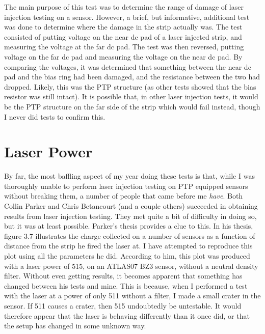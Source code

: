 \documentclass{report}
\begin{document}
            The main purpose of this test was to determine the range of damage of laser injection testing on a sensor. However, a brief, but informative, additional test was done to determine where the damage in the strip actually was. The test consisted of putting voltage on the near dc pad of a laser injected strip, and measuring the voltage at the far dc pad. The test was then reversed, putting voltage on the far dc pad and measuring the voltage on the near dc pad. By comparing the voltages, it was determined that something between the near dc pad and the bias ring had been damaged, and the resistance between the two had dropped. Likely, this was the PTP structure (as other tests showed that the bias resistor was still intact). It is possible that, in other laser injection tests, it would be the PTP structure on the far side of the strip which would fail instead, though I never did tests to confirm this.



        \section{Laser Power} \label{sect:laser_power}
            By far, the most baffling aspect of my year doing these tests is that, while I was thoroughly unable to perform laser injection testing on PTP equipped sensors without breaking them, a number of people that came before me \textit{have}. Both Collin Parker and Chris Betancourt (and a couple others) succeeded in obtaining results from laser injection testing. They met quite a bit of difficulty in doing so, but it was at least possible. Parker's thesis provides a clue to this. In his thesis, figure 3.7 illustrates the charge collected on a number of sensors as a function of distance from the strip he fired the laser at. I have attempted to reproduce this plot using all the parameters he did. According to him, this plot was produced with a laser power of 515, on an ATLAS07 BZ3 sensor, without a neutral density filter. Without even getting results, it becomes apparent that something has changed between his tests and mine. This is because, when I performed a test with the laser at a power of only 511 without a filter, I made a small crater in the sensor. If 511 causes a crater, then 515 undoubtedly be untestable. It would therefore appear that the laser is behaving differently than it once did, or that the setup has changed in some unknown way.
\end{document}
